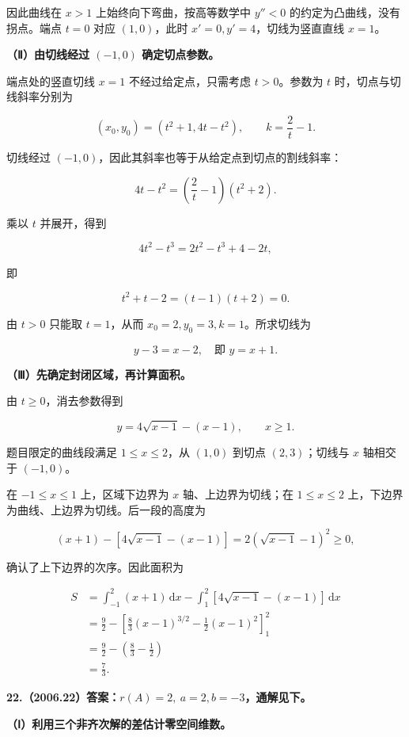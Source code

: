 \documentclass[UTF8,11pt,fontset=windows]{ctexart}
\begin{document}
因此曲线在 $x>1$ 上始终向下弯曲，按高等数学中 $y''<0$ 的约定为凸曲线，没有拐点。端点 $t=0$ 对应 $(1,0)$，此时 $x'=0,y'=4$，切线为竖直直线 $x=1$。

\textbf{（Ⅱ）由切线经过 $(-1,0)$ 确定切点参数。}

端点处的竖直切线 $x=1$ 不经过给定点，只需考虑 $t>0$。参数为 $t$ 时，切点与切线斜率分别为

$$
(x_0,y_0)=(t^2+1,4t-t^2),\qquad k=\frac2t-1.
$$

切线经过 $(-1,0)$，因此其斜率也等于从给定点到切点的割线斜率：

$$
4t-t^2=\left(\frac2t-1\right)(t^2+2).
$$

乘以 $t$ 并展开，得到

$$
4t^2-t^3=2t^2-t^3+4-2t,
$$

即

$$
t^2+t-2=(t-1)(t+2)=0.
$$

由 $t>0$ 只能取 $t=1$，从而 $x_0=2,y_0=3,k=1$。所求切线为

$$
\boxed{y-3=x-2,\quad\text{即 }y=x+1.}
$$

\textbf{（Ⅲ）先确定封闭区域，再计算面积。}

由 $t\ge0$，消去参数得到

$$
y=4\sqrt{x-1}-(x-1),\qquad x\ge1.
$$

题目限定的曲线段满足 $1\le x\le2$，从 $(1,0)$ 到切点 $(2,3)$；切线与 $x$ 轴相交于 $(-1,0)$。

在 $-1\le x\le1$ 上，区域下边界为 $x$ 轴、上边界为切线；在 $1\le x\le2$ 上，下边界为曲线、上边界为切线。后一段的高度为

$$
(x+1)-[4\sqrt{x-1}-(x-1)]
=2(\sqrt{x-1}-1)^2\ge0,
$$

确认了上下边界的次序。因此面积为

$$
\begin{aligned}
S&=\int_{-1}^2(x+1)\,\mathrm dx
-\int_1^2[4\sqrt{x-1}-(x-1)]\,\mathrm dx\\
&=\frac92-\left[\frac83(x-1)^{3/2}-\frac12(x-1)^2\right]_1^2\\
&=\frac92-\left(\frac83-\frac12\right)\\
&=\boxed{\frac73}.
\end{aligned}
$$

\clearpage

\textbf{22.（2006.22）答案：$r(A)=2,\ a=2,b=-3$，通解见下。}

\textbf{（Ⅰ）利用三个非齐次解的差估计零空间维数。}
\end{document}
